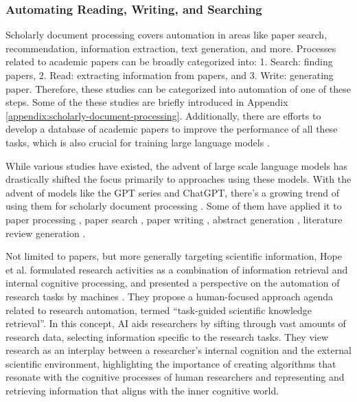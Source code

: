 \subsubsection{Automating Reading, Writing, and Searching}
Scholarly document processing covers automation in areas like paper search, recommendation, information extraction, text generation, and more. Processes related to academic papers can be broadly categorized into: 1. Search: finding papers, 2. Read: extracting information from papers, and 3. Write: generating paper. Therefore, these studies can be categorized into automation of one of these steps.  Some of the these studies are briefly introduced in Appendix \ref{appendix:scholarly-document-processing}. Additionally, there are efforts to develop a database of academic papers to improve the performance of all these tasks, which is also crucial for training large language models \cite{kinney2023semantic}. 

While various studies have existed, the advent of large scale language models has drastically shifted the focus primarily to approaches using these models. With the advent of models like the GPT series \cite{openai2023gpt} and ChatGPT, there's a growing trend of using them for scholarly document processing \cite{alzaabi2023chatgpt}. Some of them have applied it to paper processing \cite{elicit,scispace,van2023chatgpt}, paper search \cite{elicit,scispace}, paper writing \cite{transformer2022can}, abstract generation \cite{gao2023comparing}, literature review generation \cite{aydin2022openai}.


Not limited to papers, but more generally targeting scientific information, Hope et al. formulated research activities as a combination of information retrieval and internal cognitive processing, and presented a perspective on the automation of research tasks by machines \cite{hope2022computational}. They propose a human-focused approach agenda related to research automation, termed ``task-guided scientific knowledge retrieval''. In this concept, AI aids researchers by sifting through vast amounts of research data, selecting information specific to the research tasks. They view research as an interplay between a researcher's internal cognition and the external scientific environment, highlighting the importance of creating algorithms that resonate with the cognitive processes of human researchers and representing and retrieving information that aligns with the inner cognitive world.

